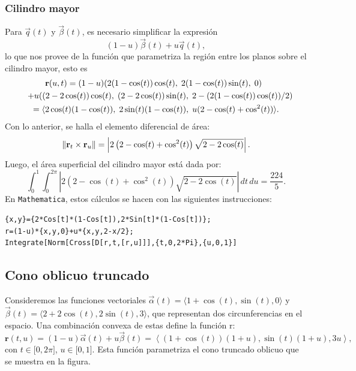 \subsubsection{Cilindro mayor}
Para $\overrightarrow{q}(t)$ y $\overrightarrow{\beta}(t)$, es necesario simplificar la expresión
\[
(1 - u)\overrightarrow{\beta}(t) + u\overrightarrow{q}(t),
\]
lo que nos provee de la función que parametriza la región entre los planos sobre el cilindro mayor, esto es
\begin{gather*}
\hspace{-0.6em}\mathbf{r}(u,t) = (1 - u)(2(1 - \cos(t))\cos(t),\; 2(1 - \cos(t))\sin(t),\; 0) \\
\quad + u((2 - 2\cos(t))\cos(t),\; (2 - 2\cos(t))\sin(t),\; 2 - (2(1 - \cos(t))\cos(t))/2) \\
= \langle 2\cos(t)(1 - \cos(t)),\; 2\sin(t)(1 - \cos(t)),\; u(2 - \cos(t) + \cos^2(t)) \rangle.
\end{gather*}
Con lo anterior, se halla el elemento diferencial de área:
\[
\left\| {\bf r}_{t} \times {\bf r}_{u} \right\| = \left| 2\left(2 - \cos(t) + \cos^2(t)\right) \sqrt{2 - 2\cos(t)} \right|.
\]
Luego, el área superficial del cilindro mayor está dada por:
\[
\int_{0}^{1} \int_{0}^{2\pi} \left| 2\left(2 - \cos(t) + \cos^2(t)\right) \sqrt{2 - 2\cos(t)} \right| \, dt \, du = \frac{224}{5}.
\]
En \verb"Mathematica", estos cálculos se hacen con las siguientes instrucciones:

\begin{tcolorbox}[title=\bf Instrucción en \verb"Mathematica"]\begin{Verbatim}[formatcom=\letraverbatim]
{x,y}={2*Cos[t]*(1-Cos[t]),2*Sin[t]*(1-Cos[t])};
r=(1-u)*{x,y,0}+u*{x,y,2-x/2};
Integrate[Norm[Cross[D[r,t,[r,u]]],{t,0,2*Pi},{u,0,1}]
\end{Verbatim}
\end{tcolorbox}

\subsection{Cono oblicuo truncado}
Consideremos las funciones vectoriales $\overrightarrow{\alpha }(t) =\langle 1+\cos \left(
t\right) ,\sin (t) ,0\rangle$ y $\overrightarrow{\beta }(t) =\langle 2+2\cos \left(
t\right) ,2\sin (t) ,3 \rangle$,
que representan dos circunferencias en el espacio. Una combinación convexa de estas define la función r:
\begin{equation*}
\mathbf{r}(t, u) = (1-u)\overrightarrow{\alpha}(t) + u\overrightarrow{\beta}(t) = \left\langle (1+\cos(t))(1+u), \sin(t)(1+u), 3u\right\rangle\!,
\end{equation*}
con $t\in \lbrack 0,2\pi ]$, $u\in \lbrack 0,1]$. Esta función parametriza el cono truncado oblicuo que se muestra en la figura.

